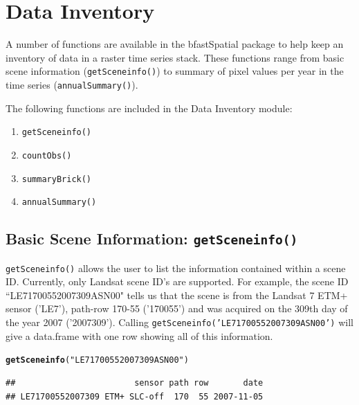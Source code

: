 \documentclass{article}\usepackage[]{graphicx}\usepackage[]{color}
\makeatletter
\newcommand{\hlstr}[1]{\textcolor[rgb]{0.192,0.494,0.8}{#1}}%
\newcommand{\hlstd}[1]{\textcolor[rgb]{0.345,0.345,0.345}{#1}}%
\newcommand{\hlkwd}[1]{\textcolor[rgb]{0.737,0.353,0.396}{\textbf{#1}}}%
\newenvironment{kframe}{%
 \def\at@end@of@kframe{}%
 \ifinner\ifhmode%
  \def\at@end@of@kframe{\end{minipage}}%
  \begin{minipage}{\columnwidth}%
 \fi\fi%
 \def\FrameCommand##1{\hskip\@totalleftmargin \hskip-\fboxsep
 \colorbox{shadecolor}{##1}\hskip-\fboxsep
     \hskip-\linewidth \hskip-\@totalleftmargin \hskip\columnwidth}%
 \MakeFramed {\advance\hsize-\width
   \@totalleftmargin\z@ \linewidth\hsize
   \@setminipage}}%
 {\par\unskip\endMakeFramed%
 \at@end@of@kframe}
\newenvironment{knitrout}{}{} %
\def\code#1{\texttt{#1}}
\makeatother
\begin{document}



\section{Data Inventory}

A number of functions are available in the bfastSpatial package to help keep an inventory of data in a raster time series stack. These functions range from basic scene information (\code{getSceneinfo()}) to summary of pixel values per year in the time series (\code{annualSummary()}).

The following functions are included in the Data Inventory module:
\begin{enumerate}
\item \code{getSceneinfo()}
\item \code{countObs()}
\item \code{summaryBrick()}
\item \code{annualSummary()}
\end{enumerate}

\subsection{Basic Scene Information: \code{getSceneinfo()}}

\code{getSceneinfo()} allows the user to list the information contained within a scene ID. Currently, only Landsat scene ID's are supported. For example, the scene ID ``LE71700552007309ASN00" tells us that the scene is from the Landsat 7 ETM+ sensor ('LE7'), path-row 170-55 ('170055') and was acquired on the 309th day of the year 2007 ('2007309'). Calling \code{getSceneinfo('LE71700552007309ASN00')} will give a data.frame with one row showing all of this information.

\begin{knitrout}
\color{fgcolor}\begin{kframe}
\begin{alltt}
\hlkwd{getSceneinfo}\hlstd{(}\hlstr{"LE71700552007309ASN00"}\hlstd{)}
\end{alltt}
\begin{verbatim}
##                        sensor path row       date
## LE71700552007309 ETM+ SLC-off  170  55 2007-11-05
\end{verbatim}
\end{kframe}
\end{knitrout}
\end{document}
